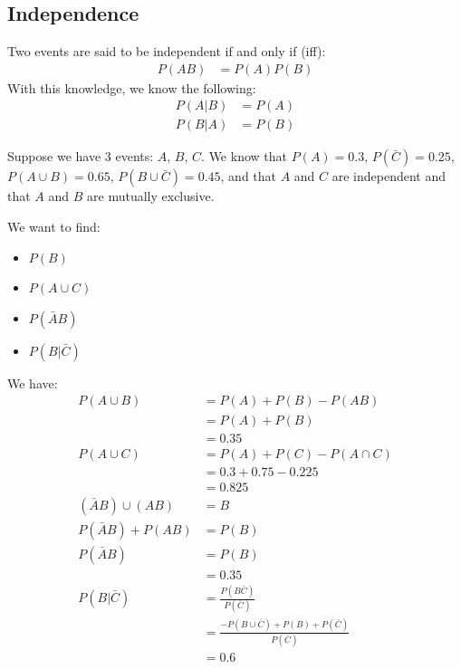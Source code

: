                 \subsection{Independence} %
                \label{sub:independence}
                    Two events are said to be independent if and only if (iff):
                    \begin{align*}
                        P(AB) &= P(A) P(B)
                    \end{align*}
                    With this knowledge, we know the following:
                    \begin{align*}
                        P(A|B) &= P(A) \\
                        P(B|A) &= P(B)
                    \end{align*}

                    \ex Suppose we have 3 events: $A$, $B$, $C$.
                    We know that $P(A) = 0.3$, $P(\bar{C}) = 0.25$, $P(A \cup B) = 0.65$, $P(B \cup \bar{C}) = 0.45$, and that $A$ and $C$ are independent and that $A$ and $B$ are mutually exclusive.

                    We want to find:
                    \begin{itemize}
                        \item $P(B)$
                        \item $P(A \cup C)$
                        \item $P(\bar{A} B)$
                        \item $P(B | \bar{C})$
                    \end{itemize}
                    We have:
                    \begin{align*}
                        P(A\cup B) &= P(A) + P(B) - P(AB) \\
                                   &= P(A) + P(B) \\
                                   &= 0.35 \\
                        P(A \cup C) &= P(A) + P(C) - P(A \cap C) \\
                                    &= 0.3 + 0.75 - 0.225 \\
                                    &= 0.825 \\
                        (\bar{A}B) \cup (AB) &= B \\
                        P(\bar{A}B) + P(AB) &= P(B) \\
                        P(\bar{A}B) &= P(B) \\
                        &= 0.35 \\
                        P(B | \bar{C}) &= \frac{P(B \bar{C})}{P(\bar{C})} \\
                                       &= \frac{-P(B \cup \bar{C}) + P(B) + P(\bar{C})}{P(\bar{C})} \\
                                       &= 0.6
                    \end{align*}
